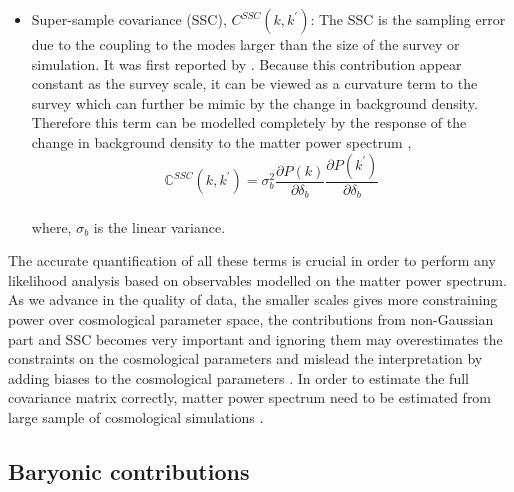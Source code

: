 \begin{itemize}
	\item Super-sample covariance (SSC), $C^{SSC}(k,k^{\prime})$: The SSC is the sampling
			error due to the coupling to the modes larger than the size of the survey or
			simulation. It was first reported by \cite{2006MNRAS.371.1188H}.
			Because this contribution appear constant as the survey scale, it 
			can be viewed as a curvature term to the survey which can further be mimic
			by the change in background density. Therefore this term can be modelled
			completely by the response of the change in background density to the
			matter power spectrum \cite{2013PhRvD..87l3504T,2014PhRvD..90j3530L},
			\begin{equation}
				\mathbb{C}^{SSC}(k,k^{\prime}) = \sigma_b^2 \dfrac{\partial P(k)}{\partial \delta_b}
										\dfrac{\partial P(k^{\prime})}{\partial \delta_b}
			\end{equation}
			\\
			where, $\sigma_b$ is the linear variance. 
\end{itemize}

The accurate quantification of all these terms is crucial in order to perform any
likelihood analysis based on observables modelled on the matter power spectrum. As we
advance in the quality of data, the smaller scales gives more constraining power 
over cosmological parameter space, the contributions from non-Gaussian part and SSC
becomes very important and ignoring them may overestimates the constraints on the 
cosmological parameters and mislead the interpretation by adding biases to the
cosmological parameters 
\cite{2000ApJ...537....1W,2007MNRAS.375L...6S,2008ApJ...686L...1L,2009MNRAS.395.2065T,2011MNRAS.416.1045K}.
In order to estimate the full covariance matrix correctly, matter power spectrum
need to be estimated from large sample of cosmological simulations
\cite{2013MNRAS.432.1928T,2009ApJ...700..479T,2015MNRAS.446.1756B}.


\subsection{Baryonic contributions}\label{sec:baryons}

